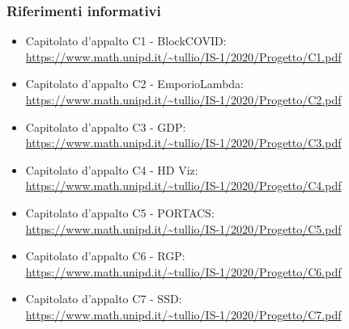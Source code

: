 \subsubsection{Riferimenti informativi}
\begin{itemize}
    \item Capitolato d'appalto C1 - BlockCOVID:\\
    \url{https://www.math.unipd.it/~tullio/IS-1/2020/Progetto/C1.pdf}
    \item Capitolato d'appalto C2 - EmporioLambda:\\
    \url{https://www.math.unipd.it/~tullio/IS-1/2020/Progetto/C2.pdf}
    \item Capitolato d'appalto C3 - GDP:\\
    \url{https://www.math.unipd.it/~tullio/IS-1/2020/Progetto/C3.pdf}
    \item Capitolato d'appalto C4 - HD Viz:\\
    \url{https://www.math.unipd.it/~tullio/IS-1/2020/Progetto/C4.pdf}
    \item Capitolato d'appalto C5 - PORTACS:\\
    \url{https://www.math.unipd.it/~tullio/IS-1/2020/Progetto/C5.pdf}
    \item Capitolato d'appalto C6 - RGP:\\
    \url{https://www.math.unipd.it/~tullio/IS-1/2020/Progetto/C6.pdf}
    \item Capitolato d'appalto C7 - SSD:\\
    \url{https://www.math.unipd.it/~tullio/IS-1/2020/Progetto/C7.pdf}
\end{itemize}